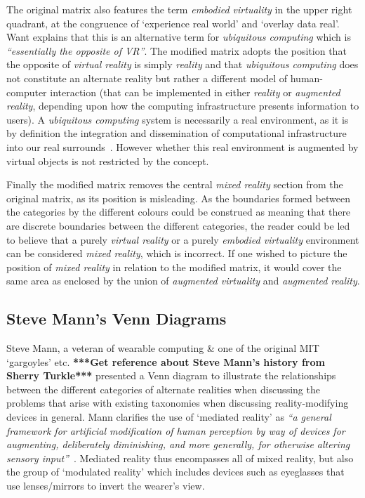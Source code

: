 The original matrix also features the term \textit{embodied virtuality} in the upper right quadrant, at the congruence of `experience real world' and `overlay data real'. Want explains that this is an alternative term for \textit{ubiquitous computing} which is \textit{``essentially the opposite of VR''}. The modified matrix adopts the position that the opposite of \textit{virtual reality} is simply \textit{reality} and that \textit{ubiquitous computing} does not constitute an alternate reality but rather a different model of human-computer interaction (that can be implemented in either \textit{reality} or \textit{augmented reality}, depending upon how the computing infrastructure presents information to users). A \textit{ubiquitous computing} system is necessarily a real environment, as it is by definition the integration and dissemination of computational infrastructure into our real surrounds~\cite{York2004}. However whether this real environment is augmented by virtual objects is not restricted by the concept.

Finally the modified matrix removes the central \textit{mixed reality} section from the original matrix, as its position is misleading. As the boundaries formed between the categories by the different colours could be construed as meaning that there are discrete boundaries between the different categories, the reader could be led to believe that a purely \textit{virtual reality} or a purely \textit{embodied virtuality} environment can be considered \textit{mixed reality}, which is incorrect. If one wished to picture the position of \textit{mixed reality} in relation to the modified matrix, it would cover the same area as enclosed by the union of \textit{augmented virtuality} and \textit{augmented reality}.


\subsection{Steve Mann's Venn Diagrams}
\label{stevemannvenn}
Steve Mann, a veteran of wearable computing \& one of the original MIT `gargoyles' etc. \textbf{***Get reference about Steve Mann's history from Sherry Turkle***} presented a Venn diagram to illustrate the relationships between the different categories of alternate realities when discussing the problems that arise with existing taxonomies when discussing reality-modifying devices in general. Mann clarifies the use of `mediated reality' as \textit{``a general framework for artificial modification of human perception by way of devices for augmenting, deliberately diminishing, and more generally, for otherwise altering sensory input''}~\cite{Mann2002a}. Mediated reality thus encompasses all of mixed reality, but also the group of `modulated reality' which includes devices such as eyeglasses that use lenses/mirrors to invert the wearer's view.

